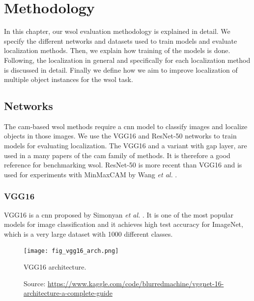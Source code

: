 \chapter{Methodology} \label{ch:methodology}

In this chapter, our \acrshort{wsol} evaluation methodology is explained in detail. We specify the different networks and datasets used to train models and evaluate localization methods. Then, we explain how training of the models is done. Following, the localization in general and specifically for each localization method is discussed in detail. Finally we define how we aim to improve localization of multiple object instances for the \acrshort{wsol} task.

\section{Networks}
The \acrshort{cam}-based \acrshort{wsol} methods require a \acrshort{cnn} model to classify images and localize objects in those images. We use the VGG16 and ResNet-50 networks to train models for evaluating localization. The VGG16 and a variant with \acrshort{gap} layer, are used in a many papers \cite{zhou2016cvpr, selvaraju2017grad, chattopadhyay2017grad, wang2020score, wang2021minmaxcam} of the \acrshort{cam} family of methods. It is therefore a good reference for benchmarking \acrshort{wsol}. ResNet-50 is more recent than VGG16 and is used for experiments with MinMaxCAM by Wang \textit{et al.} \cite{wang2021minmaxcam}.

\subsection{VGG16}
VGG16 is a \acrshort{cnn} proposed by Simonyan \textit{et al.} \cite{simonyan2014very}. It is one of the most popular models for image classification and it achieves high test accuracy for ImageNet, which is a very large dataset with 1000 different classes.
\begin{figure}[ht]
    \begin{center}       
    \texttt{[image: fig\_vgg16\_arch.png]}
    \caption[VGG16 architecture]{VGG16 architecture.}
    \caption*{Source: \href{https://www.kaggle.com/code/blurredmachine/vggnet-16-architecture-a-complete-guide}{https://www.kaggle.com/code/blurredmachine/vggnet-16-architecture-a-complete-guide}}
    \label{fig:vgg16_arch}
    \end{center}
\end{figure}

